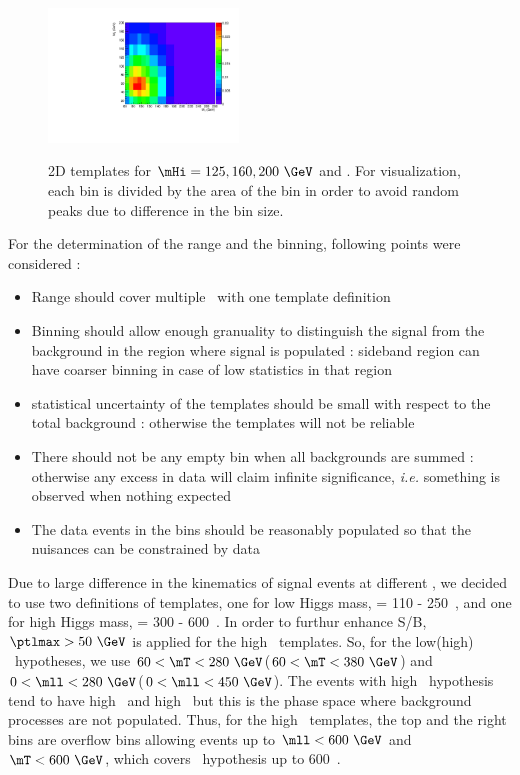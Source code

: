 \begin{figure}[htp]
{\centering
\label{subfig:2dNormBin_qqWW}
\includegraphics[width=0.45\textwidth]{figures/2dNormBin_qqWW.pdf}
}
\caption{ 2D templates for $\mHi=125, 160, 200~\GeV$ and \qqww. 
For visualization, each bin is divided by 
the area of the bin in order to avoid random peaks due to difference in the bin size.  
}
\label{fig:2dNormBin}
\end{figure}


For the determination of the range and the binning, following points were considered : 
\begin{itemize}
\item Range should cover multiple \mHi\ with one template definition
\item Binning should allow enough granuality to distinguish the signal from the background 
      in the region where signal is populated : sideband region can have coarser binning 
      in case of low statistics in that region
\item statistical uncertainty of the templates should be small with respect to the 
      total background : otherwise the templates will not be reliable  
\item There should not be any empty bin when all backgrounds are summed : otherwise any excess 
      in data will claim infinite significance, \textit{i.e.} something is observed when nothing 
      expected
\item The data events in the bins should be reasonably populated so that the nuisances 
      can be constrained by data
\end{itemize}

Due to large difference in the kinematics of signal events at different \mHi, 
we decided to use two definitions of templates, one for low Higgs mass, 
\mHi = 110 - 250~\GeV, and one for high Higgs mass, \mHi = 300 - 600~\GeV. 
In order to furthur enhance S/B, $\ptlmax>50~\GeV$ is applied for the 
high \mHi\ templates. 
So, for the low(high) \mHi\ hypotheses, we use 
$60 < \mT < 280~\GeV$($60 < \mT < 380~\GeV$)
and 
$0 < \mll < 280~\GeV$($0 < \mll < 450~\GeV$).
The events with high \mHi\ hypothesis tend to have high \mT\ and high \mll\, 
but this is the phase space where background processes are not populated. 
Thus, for the high \mHi\ templates, the top and the right bins are overflow bins 
allowing events up to $\mll<600~\GeV$ and $\mT<600~\GeV$, 
which covers \mHi\ hypothesis up to 600~\GeV.

